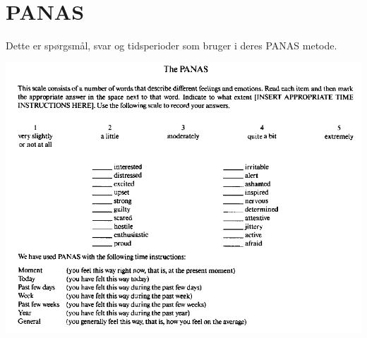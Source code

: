 \appendix

\chapter{PANAS}\label{panas:apppendix}
Dette er spørgsmål, svar og tidsperioder som \citet{panas} bruger i deres PANAS metode.

\includegraphics[width=\textwidth]{graphics/panas}